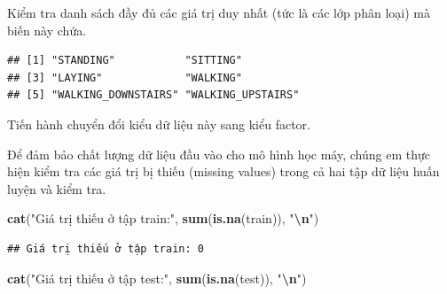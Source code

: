 \documentclass[
]{article}
\newenvironment{Shaded}{\begin{snugshade}}{\end{snugshade}}
\newcommand{\FunctionTok}[1]{\textcolor[rgb]{0.13,0.29,0.53}{\textbf{#1}}}
\newcommand{\NormalTok}[1]{#1}
\newcommand{\OtherTok}[1]{\textcolor[rgb]{0.56,0.35,0.01}{#1}}
\newcommand{\SpecialCharTok}[1]{\textcolor[rgb]{0.81,0.36,0.00}{\textbf{#1}}}
\newcommand{\StringTok}[1]{\textcolor[rgb]{0.31,0.60,0.02}{#1}}
\begin{document}
Kiểm tra danh sách đầy đủ các giá trị duy nhất (tức là các lớp phân
loại) mà biến này chứa.

\begin{Shaded}
\end{Shaded}

\begin{verbatim}
## [1] "STANDING"           "SITTING"           
## [3] "LAYING"             "WALKING"           
## [5] "WALKING_DOWNSTAIRS" "WALKING_UPSTAIRS"
\end{verbatim}

Tiến hành chuyển đổi kiểu dữ liệu này sang kiểu factor.

\begin{Shaded}
\end{Shaded}

Để đảm bảo chất lượng dữ liệu đầu vào cho mô hình học máy, chúng em thực
hiện kiểm tra các giá trị bị thiếu (missing values) trong cả hai tập dữ
liệu huấn luyện và kiểm tra.

\begin{Shaded}
\begin{Highlighting}[]
\FunctionTok{cat}\NormalTok{(}\StringTok{"Giá trị thiếu ở tập train:"}\NormalTok{, }\FunctionTok{sum}\NormalTok{(}\FunctionTok{is.na}\NormalTok{(train)), }\StringTok{"}\SpecialCharTok{\textbackslash{}n}\StringTok{"}\NormalTok{)}
\end{Highlighting}
\end{Shaded}

\begin{verbatim}
## Giá trị thiếu ở tập train: 0
\end{verbatim}

\begin{Shaded}
\begin{Highlighting}[]
\FunctionTok{cat}\NormalTok{(}\StringTok{"Giá trị thiếu ở tập test:"}\NormalTok{, }\FunctionTok{sum}\NormalTok{(}\FunctionTok{is.na}\NormalTok{(test)), }\StringTok{"}\SpecialCharTok{\textbackslash{}n}\StringTok{"}\NormalTok{)}
\end{Highlighting}
\end{Shaded}
\end{document}

